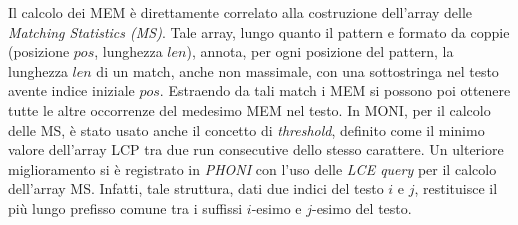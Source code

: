 \documentclass[a4paper,11pt, oneside,italian]{article}
\begin{document}
Il calcolo dei MEM è direttamente
correlato alla costruzione dell'array delle \textit{Matching Statistics (MS)}.
Tale array, lungo quanto il pattern e formato da coppie (posizione $pos$,
lunghezza $len$), annota, per ogni posizione del pattern, la lunghezza $len$ di
un match, anche non massimale, con una sottostringa nel testo avente
indice iniziale $pos$. Estraendo da tali match i MEM si possono poi ottenere
tutte le altre occorrenze del medesimo MEM nel testo. 
In MONI, per il calcolo delle MS, è stato
usato anche il concetto di \textit{threshold}, definito come
il minimo valore dell'array LCP tra due run consecutive dello stesso
carattere. Un ulteriore miglioramento si è registrato in \textit{PHONI} con
l'uso delle \textit{LCE query} per il calcolo dell'array MS. Infatti, tale
struttura, dati due indici del testo $i$ e $j$, restituisce il più lungo
prefisso comune tra i suffissi $i$-esimo e $j$-esimo del testo.


\end{document}
